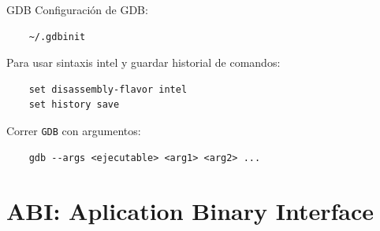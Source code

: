\documentclass[usenames,table,dvipsnames,aspectratio=169]{beamer}
\begin{document}
\begin{frame}[fragile]{GDB}
Configuración de GDB:\\
\vspace{0.1cm}
\begin{verbatim}
    ~/.gdbinit 
\end{verbatim}
\vspace{0.4cm}
Para usar sintaxis intel y guardar historial de comandos:\\
\vspace{0.1cm}
\begin{verbatim}
    set disassembly-flavor intel
    set history save
\end{verbatim}
\vspace{0.4cm}
Correr \texttt{GDB} con argumentos:
\vspace{0.1cm}
\begin{verbatim}
    gdb --args <ejecutable> <arg1> <arg2> ...
\end{verbatim}
\end{frame}

\section{ABI: Aplication Binary Interface}
\end{document}
